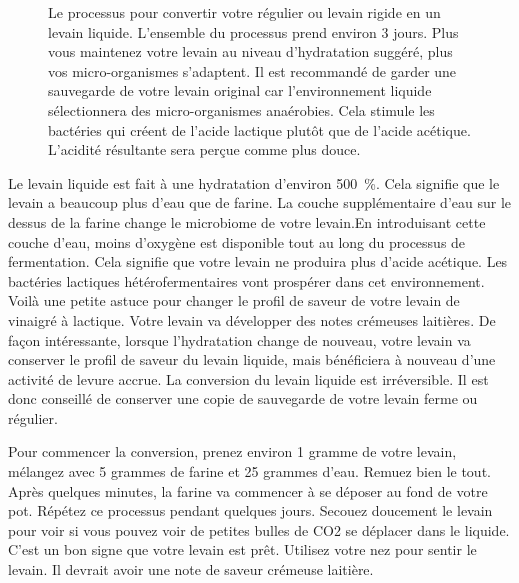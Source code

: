 \begin{figure}[!htb]
\begin{center}
  
  \caption[Conversion en un levain liquide]{Le processus pour convertir votre régulier
      ou levain rigide en un levain liquide. L'ensemble du processus prend environ 3
      jours. Plus vous maintenez votre levain au niveau d'hydratation suggéré,
      plus vos micro-organismes s'adaptent. Il est recommandé de
      garder une sauvegarde de votre levain original car l'environnement liquide sélectionnera des micro-organismes anaérobies. Cela stimule les bactéries qui créent de l'acide lactique plutôt que de l'acide acétique. L'acidité résultante sera perçue comme
      plus douce.}%
  \label{fig:liquid-starter-conversion}
\end{center}
\end{figure}

Le levain liquide est fait à une hydratation d'environ \qty{500}{\percent}. Cela signifie
que le levain a beaucoup plus d'eau que de farine. La couche supplémentaire d'eau sur
le dessus de la farine change le microbiome de votre levain.En introduisant cette couche d'eau, moins d'oxygène est disponible tout au long du processus de fermentation. Cela signifie que votre levain ne produira plus d'acide acétique. Les bactéries lactiques hétérofermentaires vont prospérer dans cet environnement. Voilà une petite astuce pour changer le profil de saveur de votre levain de vinaigré à lactique. Votre levain va développer des notes crémeuses laitières. De façon intéressante, lorsque l'hydratation change de nouveau, votre levain va conserver le profil de saveur du levain liquide, mais bénéficiera à nouveau d'une activité de levure accrue. La conversion du levain liquide est irréversible. Il est donc conseillé de conserver une copie de sauvegarde de votre levain ferme ou régulier.

Pour commencer la conversion, prenez environ 1 gramme de votre levain, mélangez avec 5 grammes de farine et 25 grammes d'eau. Remuez bien le tout. Après quelques minutes, la farine va commencer à se déposer au fond de votre pot. Répétez ce processus pendant quelques jours. Secouez doucement le levain pour voir si vous pouvez voir de petites bulles de CO2 se déplacer dans le liquide. C'est un bon signe que votre levain est prêt. Utilisez votre nez pour sentir le levain. Il devrait avoir une note de saveur crémeuse laitière.

